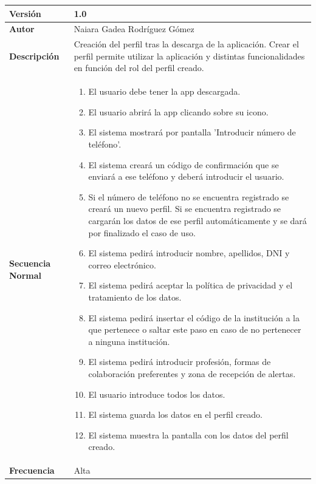 \begin{table}[htbp]
\begin{tabular}{ |m{3cm}|m{11cm}|  }
\hline
\cellcolor[HTML]{EFEFEF}\textbf{Versión}             & 1.0  \\
\hline
\cellcolor[HTML]{EFEFEF}\textbf{Autor}                & Naiara Gadea Rodríguez Gómez\\
\hline
\cellcolor[HTML]{EFEFEF}\textbf{Descripción}                & { Creación del perfil tras la descarga de la aplicación. Crear el perfil permite utilizar la aplicación y distintas funcionalidades en función del rol del perfil creado. }\\
\hline
\cellcolor[HTML]{EFEFEF}\textbf{Secuencia \newline Normal}                &                 
        \begin{enumerate}
            \item El usuario debe tener la app descargada.
            \item El usuario abrirá la app clicando sobre su icono.
            \item El sistema mostrará por pantalla 'Introducir número de teléfono'.
            \item El sistema creará un código de confirmación que se enviará a ese teléfono y deberá introducir el usuario.
            \item Si el número de teléfono no se encuentra registrado se creará un nuevo perfil. Si se encuentra registrado se cargarán los datos de ese perfil automáticamente y se dará por finalizado el caso de uso.
            \item El sistema pedirá introducir nombre, apellidos, DNI y correo electrónico.
            \item El sistema pedirá aceptar la política de privacidad y el tratamiento de los datos.
            \item El sistema pedirá insertar el código de la institución a la que pertenece o saltar este paso en caso de no pertenecer a ninguna institución.
            \item El sistema pedirá introducir profesión, formas de colaboración preferentes y zona de recepción de alertas.
            \item El usuario introduce todos los datos.
            \item El sistema guarda los datos en el perfil creado.
            \item El sistema muestra la pantalla con los datos del perfil creado.
        \end{enumerate}\\
\hline
\cellcolor[HTML]{EFEFEF}\textbf{Frecuencia}                & Alta\\

\end{tabular}
\end{table}
